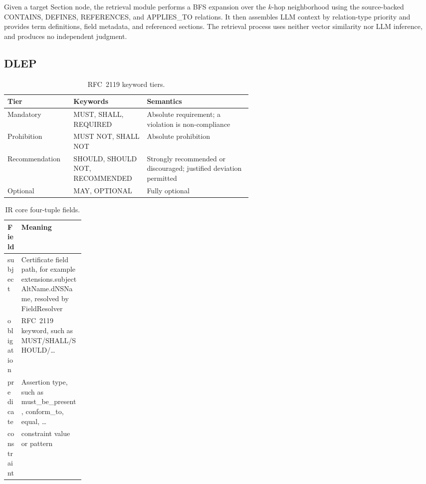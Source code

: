 Given a target Section node, the retrieval module performs a BFS expansion over the $k$-hop neighborhood using the source-backed CONTAINS, DEFINES, REFERENCES, and APPLIES\_TO relations.
It then assembles LLM context by relation-type priority and provides term definitions, field metadata, and referenced sections. The retrieval process uses neither vector similarity nor LLM inference, and produces no independent judgment.

\subsection{DLEP}
\label{sec:method-dual-layer}

\begin{table}[tb]
\centering
\caption{RFC~2119 keyword tiers.}
\label{tab:rfc2119}
\setlength{\tabcolsep}{4pt}
\begin{tabularx}{\columnwidth}{@{}L{0.27\linewidth} L{0.30\linewidth} X@{}}
\hline
Tier & Keywords & Semantics \\
\hline
Mandatory      & MUST, SHALL, REQUIRED   & Absolute requirement; a violation is non-compliance \\
Prohibition    & MUST NOT, SHALL NOT     & Absolute prohibition \\
Recommendation & SHOULD, SHOULD NOT, RECOMMENDED & Strongly recommended or discouraged; justified deviation permitted \\
Optional       & MAY, OPTIONAL           & Fully optional \\
\hline
\end{tabularx}
\end{table}

\begin{table}[tb]
\centering
\caption{IR core four-tuple fields.}
\label{tab:ir-core}
\setlength{\tabcolsep}{4pt}
\footnotesize
\begin{tabularx}{\columnwidth}{@{}L{0.18\linewidth} X@{}}
\hline
Field & Meaning \\
\hline
subject    & Certificate field path, for example extensions.\allowbreak subjectAltName.\allowbreak dNSName, resolved by FieldResolver \\
obligation & RFC~2119 keyword, such as MUST/SHALL/SHOULD/\dots \\
predicate  & Assertion type, such as must\_be\_present, conform\_to, equal, \dots \\
constraint & constraint value or pattern \\
\hline
\end{tabularx}
\end{table}

